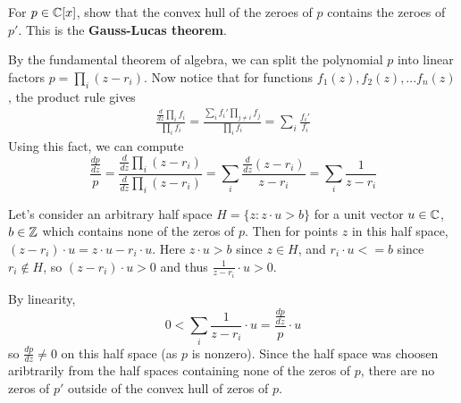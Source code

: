 \documentclass{homework}
\begin{document}
                                   \begin{problem}
                                     For $p \in \mathbb{C}[x]$, show that the convex hull of the zeroes of $p$
                                       contains the zeroes of $p'$.  This is the \textbf{Gauss-Lucas
                                           theorem}.
                                           \end{problem}
                                           \begin{solution}
                                           By the fundamental theorem of algebra, we can split the polynomial $p$ into linear factors $p = \prod_i(z - r_i).$
                                           Now notice that for functions $f_1(z), f_2(z), ... f_n(z)$, the product rule gives
                                           \begin{align}\label{log-derivative-product-to-sum}
                                           \frac{\frac{d}{dz}\prod_i f_i}{\prod_i f_i} = \frac{\sum_i f_i'\prod_{j\neq i}f_j}{\prod_i f_i} = \sum_i\frac{ f_i'}{f_i}
                                           \end{align}
                                           Using this fact, we can compute
                                           \[
                                           \frac{\frac{dp}{dz}}{p} = \frac{\frac{d}{dz}\prod_i (z - r_i)}{\frac{d}{dz}\prod_i (z - r_i)} = \sum_i \frac{\frac{d}{dz}(z-r_i)}{z - r_i} = \sum_i \frac{1}{z - r_i}
                                           \]

                                           Let's consider an arbitrary half space $H=\{z: z\cdot u > b\}$ for a unit vector $u\in\mathbb{C}$, $b\in\mathbb{Z}$ which contains none of the zeros of $p$. Then for points $z$ in this half space, $(z-r_i)\cdot u = z\cdot u - r_i \cdot u$.
                                           Here $z\cdot u > b$ since $z\in H$, and $r_i \cdot u <= b$ since $r_i\not\in H$, so $(z-r_i)\cdot u > 0$ and thus $\frac{1}{z-r_i}\cdot u > 0$.

                                           By linearity, \[0 < \sum_i \frac{1}{z - r_i} \cdot u  = \frac{\frac{dp}{dz}}{p}\cdot u\] so $\frac{dp}{dz} \neq 0$ on this half space (as $p$ is nonzero). Since the half space was choosen aribtrarily from the half spaces containing none of the zeros of $p$, there are no zeros of $p'$ outside of the convex hull of zeros of $p$.
                                           \end{solution}
\end{document}
